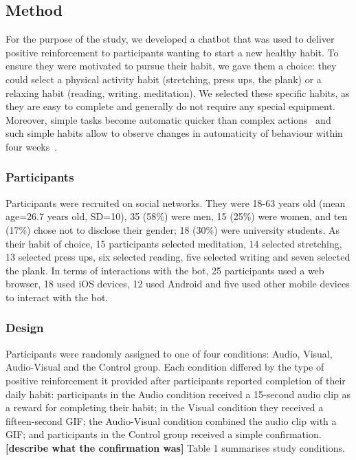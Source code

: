 \documentclass{scaffold/sigchi}
\begin{document}
\subsection{Method}
For the purpose of the study, we developed a chatbot that was used to deliver positive reinforcement to participants wanting to start a new healthy habit. To ensure they were motivated to pursue their habit, we gave them a choice: they could select a physical activity habit (stretching, press ups, the plank) or a relaxing habit (reading, writing, meditation). We selected these specific habits, as they are easy to complete and generally do not require any special equipment. Moreover, simple tasks become automatic quicker than complex actions~\cite{article_how_habits_formed_modelling_habit_formation} and such simple habits allow to observe changes in automaticity of behaviour within four weeks~\cite{article_beyond_self_tracking_designing_apps}.

\subsubsection{Participants}
Participants were recruited on social networks. They were 18-63 years old (mean age=26.7 years old, SD=10), 35 (58\%) were men, 15 (25\%) were women, and ten (17\%) chose not to disclose their gender; 18 (30\%) were university students. As their habit of choice, 15 participants selected meditation, 14 selected stretching, 13 selected press ups, six selected reading, five selected writing and seven selected the plank. In terms of interactions with the bot, 25 participants used a web browser, 18 used iOS devices, 12 used Android and five used other mobile devices to interact with the bot. 

\subsubsection{Design}
Participants were randomly assigned to one of four conditions: Audio, Visual, Audio-Visual and the Control group. Each condition differed by the type of positive reinforcement it provided after participants reported completion of their daily habit: participants in the Audio condition received a 15-second audio clip as a reward for completing their habit; in the Visual condition they received a fifteen-second GIF; the Audio-Visual condition combined the audio clip with a GIF; and participants in the Control group received a simple confirmation. 
%
\textbf{[describe what the confirmation was]}
%
Table 1 summarises study conditions. 
\end{document}

